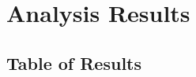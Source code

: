 \documentclass[12pt,letterpaper]{article}
\begin{document}
\pagestyle{myheadings}








\appendix
\section{Analysis Results}
\subsection{Table of Results}




\end{document}
